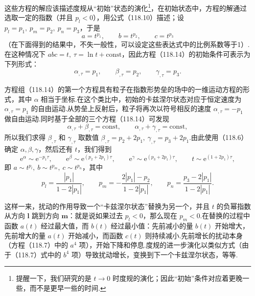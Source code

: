 这些方程的解应该描述度规从“初始”状态的演化\footnote{提醒一下，我们研究的是 $t\to0$ 时度规的演化；因此“初始”条件对应着更晚一些，而不是更早一些的时间.}，在初始状态中，方程的解通过选取一定的指数（并且 $p_{l}<0$），用公式（118.10）描述；设 $p_{l}=p_{1},\ p_{m}=p_{2},\ p_{n}=p_{3}$，于是
\begin{equation*}
  a=t^{p_{1}},\qquad b=t^{p_{2}},\qquad c=t^{p_{3}}
\end{equation*}
（在下面得到的结果中，不失一般性，可以设定这些表达式中的比例系数等于1）.在这种情况下 $abc=t,\ \tau=\ln t+\mathrm{const}$，因此方程（118.14）的初始条件可表示为下列形式：
\begin{equation*}
  \alpha_{,\tau}=p_{1},\qquad
  \beta_{,\tau}=p_{2},\qquad
  \gamma_{,\tau}=p_{3}.
\end{equation*}

方程组（118.14）的第一个方程具有粒子在指数形势垒的场中的一维运动方程的形式，其中 $\alpha$ 相当于坐标.在这个类比中，初始的卡兹涅尔状态对应于恒定速度为 $\alpha_{,\tau}=p_{1}$ 的自由运动.从势垒上反射后，粒子将再次以符号相反的速度 $\alpha_{,\tau}=-p_{1}$ 做自由运动.同时基于全部的三个方程（118.14）可发现
\begin{equation*}
  \alpha_{,\tau}+\beta_{,\tau}=\mathrm{const},\qquad
  \alpha_{,\tau}+\gamma_{,\tau}=\mathrm{const},
\end{equation*}
所以我们求得 $\beta_{,\tau}$ 和 $\gamma_{,\tau}$ 取数值 $\beta_{,\tau}=p_{2}+2p_{1},\ \gamma_{,\tau}=p_{3}+2p_{1}$.由此使用（118.6）确定 $\alpha,\beta,\gamma$，然后还有 $t$，我们得到
\begin{equation*}
  \mathrm{e}^{\alpha}\sim\mathrm{e}^{-p_{1}\tau},\qquad
  \mathrm{e}^{\beta}\sim\mathrm{e}^{(p_{2}+2p_{1})\tau},\qquad
  \mathrm{e}^{\gamma}\sim\mathrm{e}^{(p_{3}+2p_{1})\tau},\qquad
  t\sim\mathrm{e}^{(1+2p_{1})\tau},
\end{equation*}
即 $a\sim t^{p_{l}},\ b\sim t^{p_{m}},\ c\sim t^{p_{n}}$，其中
\begin{equation}
  p_{l}=\frac{|p_{1}|}{1-2|p_{1}|},\qquad
  p_{m}=-\frac{2|p_{1}|-p_{2}}{1-2|p_{1}|},\qquad
  p_{n}=\frac{p_{3}-2|p_{1}|}{1-2|p_{1}|}.
\end{equation}

这样一来，扰动的作用导致一个“卡兹涅尔状态”替换为另一个，并且 $t$ 的负幂指数从方向 $\boldsymbol{l}$ 跳到方向 $\boldsymbol{m}$：就是说如果过去 $p_{l}<0$，那么现在 $p_{m}<0$.在替换的过程中函数 $a(t)$ 经过最大值，而 $b(t)$ 经过最小值：先前减小的量 $b(t)$ 开始增大，先前增大的量 $a(t)$ 开始减小，而函数 $c(t)$ 则持续减小.先前增长的扰动本身（方程（118.7）中的 $a^{4}$ 项），开始下降和停息.度规的进一步演化以类似方式（由于（118.7）式中的 $b^{4}$ 项）导致扰动增长，变换到下一个卡兹涅尔状态，等等.

